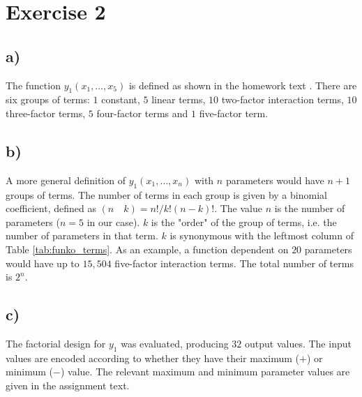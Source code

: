 \section*{Exercise 2}

\subsection*{a)}

The function $y_1(x_1, \dots , x_5)$ is defined as shown in the homework text \cite{homework-w4}. There are six groups of terms: $1$ constant, $5$ linear terms, $10$ two-factor interaction terms, $10$ three-factor terms, $5$ four-factor terms and $1$ five-factor term.

\subsection*{b)}

A more general definition of $y_1(x_1, \dots, x_n)$ with $n$ parameters would have $n + 1$ groups of terms. The number of terms in each group is given by a binomial coefficient, defined as $(n \quad k) = n!/k!(n-k)!$. The value $n$ is the number of parameters ($n = 5$ in our case). $k$ is the "order" of the group of terms, i.e. the number of parameters in that term. $k$ is synonymous with the leftmost column of Table \ref{tab:funko_terms}. As an example, a function dependent on $20$ parameters would have up to $15,504$ five-factor interaction terms. The total number of terms is $2^n$.

\subsection*{c)}

The factorial design for $y_1$ was evaluated, producing $32$ output values. The input values are encoded according to whether they have their maximum ($+$) or minimum ($-$) value. The relevant maximum and minimum parameter values are given in the assignment text. \cite[p.4]{homework-w4}


